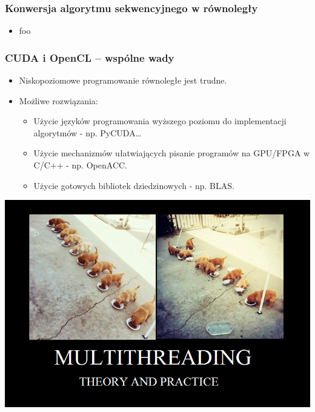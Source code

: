 \documentclass[dvipsnames,table]{beamer}
\begin{document}
\begin{frame}
	\frametitle{Konwersja algorytmu sekwencyjnego w równoległy}
\begin{itemize}
	\item foo
\end{itemize}
\end{frame}





\begin{frame}
	\frametitle{CUDA i OpenCL -- wspólne wady}
\begin{itemize}

	\item Niskopoziomowe programowanie równoległe jest trudne.
	\item Możliwe rozwiązania: 
	\begin{itemize}
	\item Użycie języków programowania wyższego poziomu do implementacji algorytmów - np. PyCUDA\ldots
	\item Użycie mechanizmów ułatwiających pisanie programów na GPU/FPGA w C/C++ - np. OpenACC.
	\item Użycie gotowych bibliotek dziedzinowych - np. BLAS.
	\end{itemize}
\end{itemize}
\begin{center}
\includegraphics[scale=0.25]{img-threadpuppies.png}
\end{center}
\end{frame}
\end{document}
